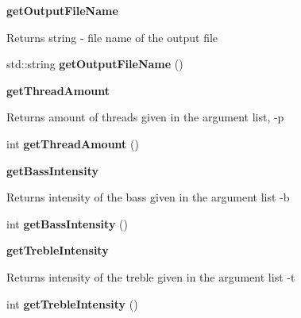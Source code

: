 \begin{Indent}{\bf get\+Output\+File\+Name}\par
{\em \begin{DoxyReturn}{Returns}
string -\/ file name of the output file 
\end{DoxyReturn}
}\begin{DoxyCompactItemize}
\item 
\hypertarget{class_command_handler_a9b9d78063e8a2549c8dfeb1576346545}{}std\+::string {\bfseries get\+Output\+File\+Name} ()\label{class_command_handler_a9b9d78063e8a2549c8dfeb1576346545}

\end{DoxyCompactItemize}
\end{Indent}
\begin{Indent}{\bf get\+Thread\+Amount}\par
{\em \begin{DoxyReturn}{Returns}
amount of threads given in the argument list, -\/p 
\end{DoxyReturn}
}\begin{DoxyCompactItemize}
\item 
\hypertarget{class_command_handler_a9c50eace565ec24bd313ad39857e626d}{}int {\bfseries get\+Thread\+Amount} ()\label{class_command_handler_a9c50eace565ec24bd313ad39857e626d}

\end{DoxyCompactItemize}
\end{Indent}
\begin{Indent}{\bf get\+Bass\+Intensity}\par
{\em \begin{DoxyReturn}{Returns}
intensity of the bass given in the argument list -\/b 
\end{DoxyReturn}
}\begin{DoxyCompactItemize}
\item 
\hypertarget{class_command_handler_aff3405603f10b5f96619e86b741bad19}{}int {\bfseries get\+Bass\+Intensity} ()\label{class_command_handler_aff3405603f10b5f96619e86b741bad19}

\end{DoxyCompactItemize}
\end{Indent}
\begin{Indent}{\bf get\+Treble\+Intensity}\par
{\em \begin{DoxyReturn}{Returns}
intensity of the treble given in the argument list -\/t 
\end{DoxyReturn}
}\begin{DoxyCompactItemize}
\item 
\hypertarget{class_command_handler_aa52e40a561ad8ba0a72772cbf4993d5e}{}int {\bfseries get\+Treble\+Intensity} ()\label{class_command_handler_aa52e40a561ad8ba0a72772cbf4993d5e}

\end{DoxyCompactItemize}
\end{Indent}
